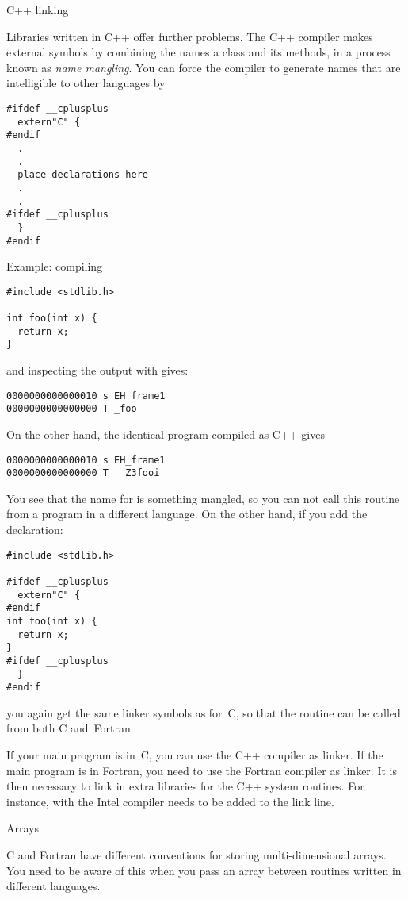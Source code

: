  {C++ linking}

Libraries written in C++ offer further problems.
The C++ compiler makes external symbols by combining
the names a class and its methods, in a process known
as \emph{name mangling}.
You can force the compiler to
generate names that are intelligible to other languages by
\begin{verbatim}
#ifdef __cplusplus
  extern"C" {
#endif
  .
  .
  place declarations here
  .
  .
#ifdef __cplusplus
  }
#endif
\end{verbatim}

Example:
compiling
\begin{verbatim}
#include <stdlib.h>

int foo(int x) {
  return x;
}
\end{verbatim}
and inspecting the output with  gives:
\begin{verbatim}
0000000000000010 s EH_frame1
0000000000000000 T _foo
\end{verbatim}
On the other hand, the identical program compiled as C++ gives
\begin{verbatim}
0000000000000010 s EH_frame1
0000000000000000 T __Z3fooi
\end{verbatim}
You see that the name for  is something mangled, so you can not call 
this routine from a program in a different language. On the other hand,
if you add the  declaration:
\begin{verbatim}
#include <stdlib.h>

#ifdef __cplusplus
  extern"C" {
#endif
int foo(int x) {
  return x;
}
#ifdef __cplusplus
  }
#endif
\end{verbatim}
you again get the same linker symbols as for~C, so that the routine
can be called from both C and~Fortran.

If your main program is in~C, you can use the C++ compiler as linker.
If the main program is in Fortran, you need to use the Fortran
compiler as linker. It is then necessary to link in extra
libraries for the C++ system routines. For instance, with the 
Intel compiler  needs to be added to the link line.


 {Arrays}
\label{sec:CFarrays}

C and Fortran have different conventions for storing multi-dimensional
arrays. You need to be aware of this when you pass an array between
routines written in different languages. 

